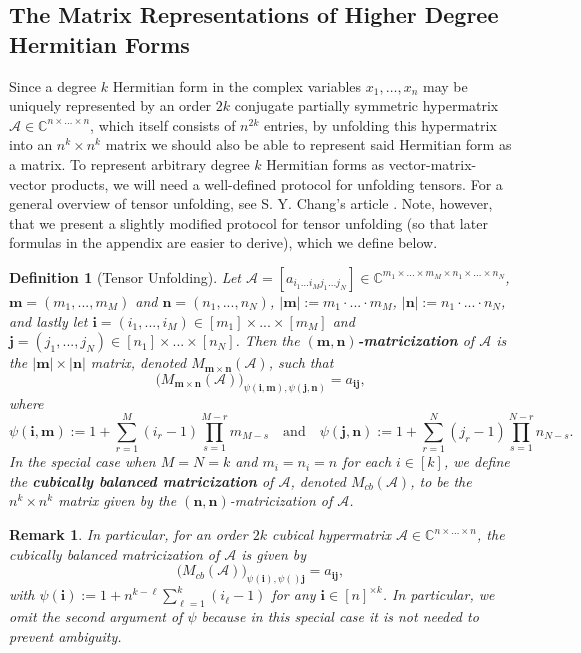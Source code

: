 \documentclass[11pt]{article}
\newtheorem{defn}[theorem]{Definition}
\newtheorem{remark}[theorem]{Remark}
\begin{document}
\subsection{The Matrix Representations of Higher Degree Hermitian Forms}
Since a degree $k$ Hermitian form in the complex variables $x_1,\dots,x_n$ may be uniquely represented by an order $2k$ conjugate partially symmetric hypermatrix $\mathcal{A}\in \mathbb{C}^{n\times\dots\times n}$, which itself consists of $n^{2k}$ entries, by unfolding this hypermatrix into an $n^k\times n^k$ matrix we should also be able to represent said Hermitian form as a matrix. To represent arbitrary degree $k$ Hermitian forms as vector-matrix-vector products, we will need a well-defined protocol for unfolding tensors. For a general overview of tensor unfolding, see S. Y. Chang's article \cite{chang2023tensor}. Note, however, that we present a slightly modified protocol for tensor unfolding (so that later formulas in the appendix are easier to derive), which we define below.
\begin{defn}[Tensor Unfolding]\label{Matricization}
    Let $\mathcal{A} = [a_{i_1\dots i_M j_1\dots j_N}]\in \mathbb{C}^{m_1\times...\times m_M\times n_1\times...\times n_N}$, $\mathbf{m} = (m_1,...,m_M)$ and $\mathbf{n} = (n_1,...,n_N)$, $|\mathbf{m}| := m_1\cdot...\cdot m_M$, $|\mathbf{n}| := n_1\cdot...\cdot n_N$, and lastly let $\mathbf{i} = (i_1,...,i_M)\in [m_1]\times...\times [m_M]$ and $\mathbf{j} = (j_1,...,j_N)\in [n_1]\times...\times [n_N]$. Then the \textbf{$\boldsymbol{(m,n)}$-matricization} of $\mathcal{A}$ is the $|\mathbf{m}|\times |\mathbf{n}|$ matrix, denoted $M_{\mathbf{m}\times \mathbf{n}}(\mathcal{A})$, such that 
    \[\big(M_{\mathbf{m}\times \mathbf{n}}(\mathcal{A})\big)_{\psi(\mathbf{i},\mathbf{m}),\psi(\mathbf{j},\mathbf{n})} = a_{\mathbf{i}\mathbf{j}},\]
    where  
    \[\psi(\mathbf{i},\mathbf{m}) := 1+\sum\limits_{r=1}^M(i_r-1)\prod\limits_{s=1}^{M-r}m_{M-s}\quad\text{and}\quad \psi(\mathbf{j},\mathbf{n}) := 1+\sum\limits_{r=1}^N(j_r-1)\prod\limits_{s=1}^{N-r}n_{N-s}.\]
    In the special case when $M=N=k$ and $m_i=n_i=n$ for each $i\in [k]$, we define the \textbf{cubically balanced matricization} of $\mathcal{A}$, denoted $M_{cb}(\mathcal{A})$, to be the $n^k\times n^k$ matrix given by the $(\mathbf{n},\mathbf{n})$-matricization of $\mathcal{A}$. 
\end{defn}
\begin{remark}
    In particular, for an order $2k$ cubical hypermatrix $\mathcal{A}\in \mathbb{C}^{n\times\dots\times n}$, the cubically balanced matricization of $\mathcal{A}$ is given by 
    \[\big(M_{cb}(\mathcal{A})\big)_{\psi(\mathbf{i}),\psi()\mathbf{j}} = a_{\mathbf{i}\mathbf{j}},\]
    with $\psi(\mathbf{i}) := 1+n^{k-\ell}\sum\limits_{\ell=1}^k(i_{\ell}-1)$ for any $\mathbf{i}\in [n]^{\times k}$. In particular, we omit the second argument of $\psi$ because in this special case it is not needed to prevent ambiguity. 
\end{remark}
\end{document}
